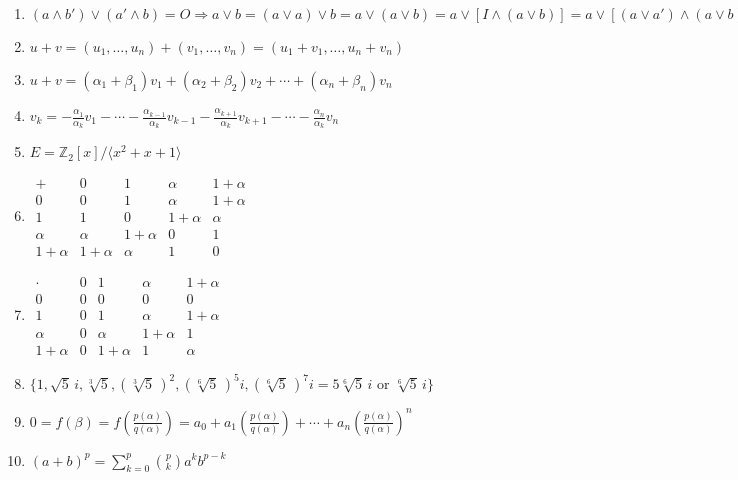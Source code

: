 \documentclass[oneside,10pt,]{article}
\begin{document}
\begin{enumerate}
\item{}\(\displaystyle ( a \wedge b') \vee (a' \wedge b) = O \Rightarrow a \vee b = (a \vee a) \vee b = a \vee (a \vee b) = a \vee [I \wedge (a \vee b)] = a \vee [(a \vee a') \wedge (a \vee b)] = [a \vee (a \wedge b')] \vee [a \vee (a' \wedge b)] = a \vee [(a \wedge b') \vee (a' \wedge b)] = a \vee 0 = a\)%
\item{}\(\displaystyle u + v = (u_1, \ldots, u_n) + (v_1, \ldots, v_n) = (u_1 + v_1, \ldots, u_n + v_n)\)%
\item{}\(\displaystyle u + v =( \alpha_1 + \beta_1) v_1 + (\alpha_2+ \beta_2) v_2 + \cdots + (\alpha_n + \beta_n) v_n\)%
\item{}\(\displaystyle v_k = - \frac{\alpha_1}{\alpha_k} v_1 - \cdots - \frac{\alpha_{k - 1}}{\alpha_k} v_{k-1} - \frac{\alpha_{k + 1}}{\alpha_k} v_{k + 1} - \cdots - \frac{\alpha_n}{\alpha_k} v_n\)%
\item{}\(\displaystyle E = {\mathbb Z}_2[x] / \langle x^2 + x + 1 \rangle\)%
\item{}\(\displaystyle \begin{array}{c|cccc} + & 0 & 1 & \alpha & 1 + \alpha \\ \hline 0 & 0 & 1 & \alpha & 1 + \alpha \\ 1 & 1 & 0 & 1 + \alpha & \alpha \\ \alpha & \alpha & 1 + \alpha & 0 & 1 \\ 1 + \alpha & 1 + \alpha & \alpha & 1 & 0 \end{array}\)%
\item{}\(\displaystyle \begin{array}{c|cccc} \cdot & 0 & 1 & \alpha & 1 + \alpha \\ \hline 0 & 0 & 0 & 0 & 0 \\ 1 & 0 & 1 & \alpha & 1 + \alpha \\ \alpha & 0 & \alpha & 1 + \alpha & 1 \\ 1 + \alpha & 0 & 1 + \alpha & 1 & \alpha \end{array}\)%
\item{}\(\displaystyle \{ 1, \sqrt{5}\, i, \sqrt[3]{5}, (\sqrt[3]{5}\, )^2, (\sqrt[6]{5}\, )^5 i, (\sqrt[6]{5}\, )^7 i = 5 \sqrt[6]{5}\, i \text{ or } \sqrt[6]{5}\, i \}\)%
\item{}\(\displaystyle 0 = f(\beta) = f\left( \frac{p(\alpha)}{q(\alpha)} \right) = a_0 + a_1 \left( \frac{p(\alpha)}{q(\alpha)} \right) + \cdots + a_n \left( \frac{p(\alpha)}{q(\alpha)} \right)^n\)%
\item{}\(\displaystyle (a + b)^p = \sum_{k = 0}^{p} \binom{p}{k} a^k b^{p - k}\)%

\end{enumerate}
\end{document}
